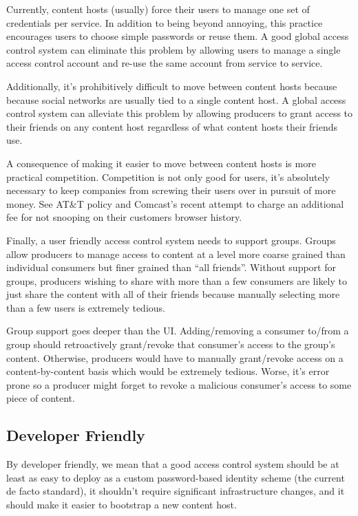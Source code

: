 \documentclass[pdftex,12pt,a4papaer,twoside,notitlepage]{report}
\begin{document}
Currently, content hosts (usually) force their users to manage one set of
credentials per service. In addition to being beyond annoying, this practice
encourages users to choose simple passwords or reuse them. A good global access
control system can eliminate this problem by allowing users to manage a single
access control account and re-use the same account from service to service.

Additionally, it's prohibitively difficult to move between content hosts because
because social networks are usually tied to a single content host. A global
access control system can alleviate this problem by allowing producers to
grant access to their friends on any content host regardless of what content
hosts their friends use.

A consequence of making it easier to move between content hosts is more
practical competition. Competition is not only good for users, it's absolutely
necessary to keep companies from screwing their users over in pursuit of more
money. See AT\&T\texttrademark{}\cite{att} policy and
Comcast's\texttrademark{}\cite{comcast} recent attempt to charge an additional
fee for not snooping on their customers browser history.

Finally, a user friendly access control system needs to support groups. Groups
allow producers to manage access to content at a level more coarse grained than
individual consumers but finer grained than ``all friends''. Without support for
groups, producers wishing to share with more than a few consumers are likely to
just share the content with all of their friends because manually selecting more
than a few users is extremely tedious.

Group support goes deeper than the UI. Adding/removing a consumer to/from a
group should retroactively grant/revoke that consumer's access to the group's
content. Otherwise, producers would have to manually grant/revoke access on a
content-by-content basis which would be extremely tedious. Worse, it's error
prone so a producer might forget to revoke a malicious consumer's access to some
piece of content.

\subsection{Developer Friendly}
\label{sub:goal-developer}

By developer friendly, we mean that a good access control system should be at
least as easy to deploy as a custom password-based identity scheme (the current
de facto standard), it shouldn't require significant infrastructure changes, and
it should make it easier to bootstrap a new content host.
\end{document}
